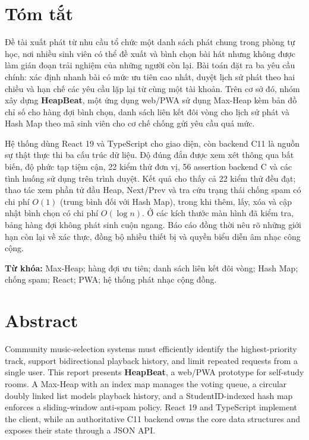 \documentclass[12pt,a4paper,twoside,openright]{report}
\begin{document}
\vfill
\cleardoublepage

\hypersetup{pageanchor=true}
\setcounter{page}{1}

\chapter*{Tóm tắt}
Đề tài xuất phát từ nhu cầu tổ chức một danh sách phát chung trong phòng tự học, nơi nhiều
sinh viên có thể đề xuất và bình chọn bài hát nhưng không được làm gián đoạn trải nghiệm
của những người còn lại. Bài toán đặt ra ba yêu cầu chính: xác định nhanh bài có mức ưu
tiên cao nhất, duyệt lịch sử phát theo hai chiều và hạn chế các yêu cầu lặp lại từ cùng một
tài khoản. Trên cơ sở đó, nhóm xây dựng \textbf{HeapBeat}, một ứng dụng web/PWA sử dụng
Max-Heap kèm bản đồ chỉ số cho hàng đợi bình chọn, danh sách liên kết đôi vòng cho lịch sử
phát và Hash Map theo mã sinh viên cho cơ chế chống gửi yêu cầu quá mức.

Hệ thống dùng React 19 và TypeScript cho giao diện, còn backend C11 là nguồn sự thật thực thi
ba cấu trúc dữ liệu. Độ đúng đắn được xem xét thông qua bất biến,
độ phức tạp tiệm cận, 22 kiểm thử đơn vị, 56 assertion backend C và các tình huống sử dụng
trên trình duyệt. Kết quả cho thấy cả 22 kiểm thử đều đạt; thao tác xem phần tử đầu Heap,
Next/Prev và tra cứu trạng thái chống spam có chi phí $O(1)$ (trung bình đối với Hash Map),
trong khi thêm, lấy, xóa và cập nhật bình chọn có chi phí $O(\log n)$. Ở các kích thước màn
hình đã kiểm tra, bảng hàng đợi không phát sinh cuộn ngang. Báo cáo đồng thời nêu rõ những
giới hạn còn lại về xác thực, đồng bộ nhiều thiết bị và quyền biểu diễn âm nhạc công cộng.

\textbf{Từ khóa:} Max-Heap; hàng đợi ưu tiên; danh sách liên kết đôi vòng; Hash Map;
chống spam; React; PWA; hệ thống phát nhạc cộng đồng.

\cleardoublepage
\chapter*{Abstract}
Community music-selection systems must efficiently identify the highest-priority track,
support bidirectional playback history, and limit repeated requests from a single user.
This report presents \textbf{HeapBeat}, a web/PWA prototype for self-study rooms. A
Max-Heap with an index map manages the voting queue, a circular doubly linked list models
playback history, and a StudentID-indexed hash map enforces a sliding-window anti-spam
policy. React 19 and TypeScript implement the client, while an authoritative C11 backend
owns the core data structures and exposes their state through a JSON API.
\end{document}
